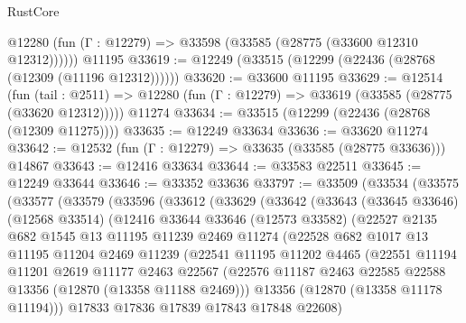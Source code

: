 \begin{lexlean}{RustCore}
\begin{coremodule}
      @12280 (fun (Γ : @12279) => @33598 (@33585 (@28775 (@33600 @12310 @12312))))))
    @11195
@33619 := @12249 (@33515 (@12299 (@22436 (@28768 (@12309 (@11196 @12312))))))
@33620 := @33600 @11195
@33629 := @12514
    (fun (tail : @2511) => @12280 (fun (Γ : @12279) => @33619 (@33585 (@28775 (@33620 @12312)))))
    @11274
@33634 := @33515 (@12299 (@22436 (@28768 (@12309 @11275))))
@33635 := @12249 @33634
@33636 := @33620 @11274
@33642 := @12532 (fun (Γ : @12279) => @33635 (@33585 (@28775 @33636))) @14867
@33643 := @12416 @33634
@33644 := @33583 @22511
@33645 := @12249 @33644
@33646 := @33352 @33636
@33797 := @33509
    (@33534
      (@33575
        (@33577
          (@33579
            (@33596
              (@33612
                (@33629
                  (@33642
                    (@33643
                      (@33645 @33646)
                      (@12568 @33514)
                      (@12416
                        @33644
                        @33646
                        (@12573 @33582)
                        (@22527
                          @2135
                          @682
                          @1545
                          @13
                          @11195
                          @11239
                          @2469
                          @11274
                          (@22528
                            @682
                            @1017
                            @13
                            @11195
                            @11204
                            @2469
                            @11239
                            (@22541
                              @11195
                              @11202
                              @4465
                              (@22551
                                @11194
                                @11201
                                @2619
                                @11177
                                @2463
                                @22567
                                (@22576
                                  @11187
                                  @2463
                                  @22585
                                  @22588
                                  @13356
                                  (@12870 (@13358 @11188 @2469)))
                                @13356
                                (@12870 (@13358 @11178 @11194)))
                              @17833
                              @17836
                              @17839
                              @17843
                              @17848
                              @22608)

\end{coremodule}
\end{lexlean}

